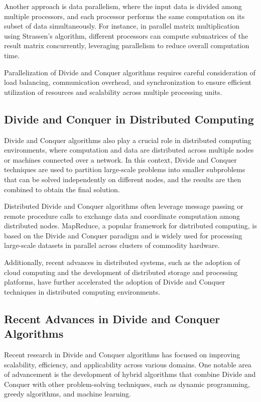 \documentclass[12pt]{book} %
\begin{document}
Another approach is data parallelism, where the input data is divided among multiple processors, and each processor performs the same computation on its subset of data simultaneously. For instance, in parallel matrix multiplication using Strassen's algorithm, different processors can compute submatrices of the result matrix concurrently, leveraging parallelism to reduce overall computation time.

Parallelization of Divide and Conquer algorithms requires careful consideration of load balancing, communication overhead, and synchronization to ensure efficient utilization of resources and scalability across multiple processing units.

\subsection{Divide and Conquer in Distributed Computing}

Divide and Conquer algorithms also play a crucial role in distributed computing environments, where computation and data are distributed across multiple nodes or machines connected over a network. In this context, Divide and Conquer techniques are used to partition large-scale problems into smaller subproblems that can be solved independently on different nodes, and the results are then combined to obtain the final solution.

Distributed Divide and Conquer algorithms often leverage message passing or remote procedure calls to exchange data and coordinate computation among distributed nodes. MapReduce, a popular framework for distributed computing, is based on the Divide and Conquer paradigm and is widely used for processing large-scale datasets in parallel across clusters of commodity hardware.

Additionally, recent advances in distributed systems, such as the adoption of cloud computing and the development of distributed storage and processing platforms, have further accelerated the adoption of Divide and Conquer techniques in distributed computing environments.

\subsection{Recent Advances in Divide and Conquer Algorithms}

Recent research in Divide and Conquer algorithms has focused on improving scalability, efficiency, and applicability across various domains. One notable area of advancement is the development of hybrid algorithms that combine Divide and Conquer with other problem-solving techniques, such as dynamic programming, greedy algorithms, and machine learning.
\end{document}
